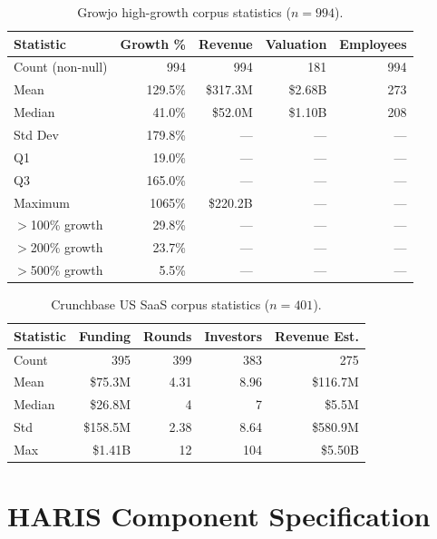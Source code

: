 \documentclass[preprint,12pt]{elsarticle}
\begin{document}
\begin{table}[h]
\centering
\caption{Growjo high-growth corpus statistics ($n{=}994$).}
\label{tab:growjo_stats}
\begin{tabular}{lrrrr}
\toprule
\textbf{Statistic} & \textbf{Growth \%} & \textbf{Revenue} & \textbf{Valuation} & \textbf{Employees} \\
\midrule
Count (non-null) & 994     & 994       & 181       & 994 \\
Mean             & 129.5\% & \$317.3M  & \$2.68B   & 273 \\
Median           & 41.0\%  & \$52.0M   & \$1.10B   & 208 \\
Std Dev          & 179.8\% & ---       & ---       & --- \\
Q1               & 19.0\%  & ---       & ---       & --- \\
Q3               & 165.0\% & ---       & ---       & --- \\
Maximum          & 1065\%  & \$220.2B  & ---       & --- \\
$>$100\% growth  & 29.8\%  & ---       & ---       & --- \\
$>$200\% growth  & 23.7\%  & ---       & ---       & --- \\
$>$500\% growth  & 5.5\%   & ---       & ---       & --- \\
\bottomrule
\end{tabular}
\end{table}

\begin{table}[h]
\centering
\caption{Crunchbase US SaaS corpus statistics ($n{=}401$).}
\label{tab:crunchbase_stats}
\begin{tabular}{lrrrr}
\toprule
\textbf{Statistic} & \textbf{Funding} & \textbf{Rounds} & \textbf{Investors} & \textbf{Revenue Est.} \\
\midrule
Count  & 395      & 399  & 383  & 275 \\
Mean   & \$75.3M  & 4.31 & 8.96 & \$116.7M \\
Median & \$26.8M  & 4    & 7    & \$5.5M \\
Std    & \$158.5M & 2.38 & 8.64 & \$580.9M \\
Max    & \$1.41B  & 12   & 104  & \$5.50B \\
\bottomrule
\end{tabular}
\end{table}

\section{HARIS Component Specification}
\end{document}
